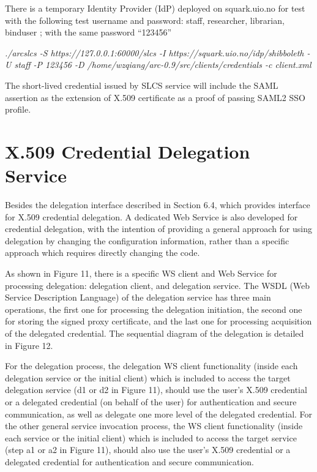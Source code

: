 \documentclass{article}                            %
\begin{document}
    There is a temporary Identity Provider (IdP) deployed on squark.uio.no for test with the following test username and password: staff, researcher, librarian, binduser ; with the same password ``123456''

\textit{./arcslcs -S https://127.0.0.1:60000/slcs -I https://squark.uio.no/idp/shibboleth -U staff -P 123456 -D /home/wzqiang/arc-0.9/src/clients/credentials -c client.xml}

    The short-lived credential issued by SLCS service will include the SAML assertion as the extension of X.509 certificate as a proof of passing SAML2 SSO profile.





\section{X.509 Credential Delegation Service} %
\label{sec:delegation_service}
Besides the delegation interface described in Section 6.4, which provides interface for X.509 credential delegation. A dedicated Web Service is also developed for credential delegation, with the intention of providing a general approach for using delegation by changing the configuration information, rather than a specific approach which requires directly changing the code.

    As shown in Figure 11, there is a specific WS client and Web Service for processing delegation: delegation client, and delegation service. The WSDL (Web Service Description Language) of the delegation service has three main operations, the first one for processing the delegation initiation, the second one for storing the signed proxy certificate, and the last one for processing acquisition of the delegated credential. The sequential diagram of the delegation is detailed in Figure 12.

    For the delegation process, the delegation WS client functionality (inside each delegation service or the initial client) which is included to access the target delegation service (d1 or d2 in Figure 11), should use the user’s X.509 credential or a delegated credential (on behalf of the user) for authentication and secure communication, as well as delegate one more level of the delegated credential. For the other general  service invocation process, the WS client functionality (inside each service or the initial client) which is included to access the target service (step a1 or a2 in Figure 11), should also use the user’s X.509 credential or a delegated credential for authentication and secure communication.
\end{document}
